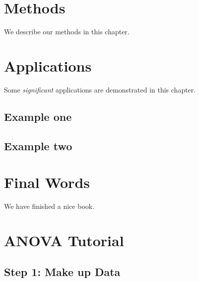 \documentclass[
]{book}
\newenvironment{Shaded}{\begin{snugshade}}{\end{snugshade}}
\newcommand{\AttributeTok}[1]{\textcolor[rgb]{0.77,0.63,0.00}{#1}}
\newcommand{\ConstantTok}[1]{\textcolor[rgb]{0.00,0.00,0.00}{#1}}
\newcommand{\DecValTok}[1]{\textcolor[rgb]{0.00,0.00,0.81}{#1}}
\newcommand{\FunctionTok}[1]{\textcolor[rgb]{0.00,0.00,0.00}{#1}}
\newcommand{\NormalTok}[1]{#1}
\newcommand{\SpecialCharTok}[1]{\textcolor[rgb]{0.00,0.00,0.00}{#1}}
\begin{document}
\hypertarget{methods}{%
\chapter{Methods}\label{methods}}

We describe our methods in this chapter.

\hypertarget{applications}{%
\chapter{Applications}\label{applications}}

Some \emph{significant} applications are demonstrated in this chapter.

\hypertarget{example-one}{%
\section{Example one}\label{example-one}}

\hypertarget{example-two}{%
\section{Example two}\label{example-two}}

\hypertarget{final-words}{%
\chapter{Final Words}\label{final-words}}

We have finished a nice book.

\hypertarget{anova-tutorial}{%
\chapter{ANOVA Tutorial}\label{anova-tutorial}}

\begin{Shaded}
\end{Shaded}

\hypertarget{step-1-make-up-data}{%
\section{Step 1: Make up Data}\label{step-1-make-up-data}}
\end{document}
